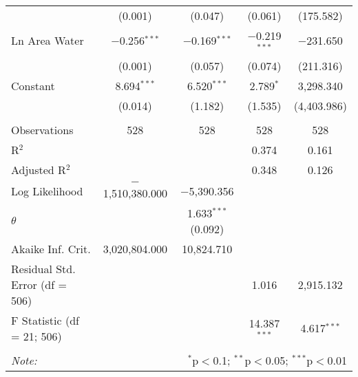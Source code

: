 \begin{table}[!htbp]
\begin{tabular}{@{\extracolsep{5pt}}lcccc}
  & (0.001) & (0.047) & (0.061) & (175.582) \\ 
  Ln Area Water & $-$0.256$^{***}$ & $-$0.169$^{***}$ & $-$0.219$^{***}$ & $-$231.650 \\ 
  & (0.001) & (0.057) & (0.074) & (211.316) \\ 
  Constant & 8.694$^{***}$ & 6.520$^{***}$ & 2.789$^{*}$ & 3,298.340 \\ 
  & (0.014) & (1.182) & (1.535) & (4,403.986) \\ 
 \hline \\[-1.8ex] 
Observations & 528 & 528 & 528 & 528 \\ 
R$^{2}$ &  &  & 0.374 & 0.161 \\ 
Adjusted R$^{2}$ &  &  & 0.348 & 0.126 \\ 
Log Likelihood & $-$1,510,380.000 & $-$5,390.356 &  &  \\ 
$\theta$ &  & 1.633$^{***}$  (0.092) &  &  \\ 
Akaike Inf. Crit. & 3,020,804.000 & 10,824.710 &  &  \\ 
Residual Std. Error (df = 506) &  &  & 1.016 & 2,915.132 \\ 
F Statistic (df = 21; 506) &  &  & 14.387$^{***}$ & 4.617$^{***}$ \\ 
\hline 
\hline \\[-1.8ex] 
\textit{Note:}  & \multicolumn{4}{r}{$^{*}$p$<$0.1; $^{**}$p$<$0.05; $^{***}$p$<$0.01} \\ 
\end{tabular} 
\end{table} 
